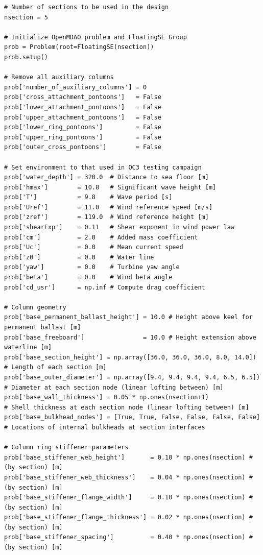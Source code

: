 \begin{lstlisting}
# Number of sections to be used in the design
nsection = 5

# Initialize OpenMDAO problem and FloatingSE Group
prob = Problem(root=FloatingSE(nsection))
prob.setup()

# Remove all auxiliary columns
prob['number_of_auxiliary_columns'] = 0
prob['cross_attachment_pontoons']   = False
prob['lower_attachment_pontoons']   = False
prob['upper_attachment_pontoons']   = False
prob['lower_ring_pontoons']         = False
prob['upper_ring_pontoons']         = False
prob['outer_cross_pontoons']        = False

# Set environment to that used in OC3 testing campaign
prob['water_depth'] = 320.0  # Distance to sea floor [m]
prob['hmax']        = 10.8   # Significant wave height [m]
prob['T']           = 9.8    # Wave period [s]
prob['Uref']        = 11.0   # Wind reference speed [m/s]
prob['zref']        = 119.0  # Wind reference height [m]
prob['shearExp']    = 0.11   # Shear exponent in wind power law
prob['cm']          = 2.0    # Added mass coefficient
prob['Uc']          = 0.0    # Mean current speed
prob['z0']          = 0.0    # Water line
prob['yaw']         = 0.0    # Turbine yaw angle
prob['beta']        = 0.0    # Wind beta angle
prob['cd_usr']      = np.inf # Compute drag coefficient

# Column geometry
prob['base_permanent_ballast_height'] = 10.0 # Height above keel for permanent ballast [m]
prob['base_freeboard']                = 10.0 # Height extension above waterline [m]
prob['base_section_height'] = np.array([36.0, 36.0, 36.0, 8.0, 14.0])  # Length of each section [m]
prob['base_outer_diameter'] = np.array([9.4, 9.4, 9.4, 9.4, 6.5, 6.5]) # Diameter at each section node (linear lofting between) [m]
prob['base_wall_thickness'] = 0.05 * np.ones(nsection+1)               # Shell thickness at each section node (linear lofting between) [m]
prob['base_bulkhead_nodes'] = [True, True, False, False, False, False] # Locations of internal bulkheads at section interfaces

# Column ring stiffener parameters
prob['base_stiffener_web_height']       = 0.10 * np.ones(nsection) # (by section) [m]
prob['base_stiffener_web_thickness']    = 0.04 * np.ones(nsection) # (by section) [m]
prob['base_stiffener_flange_width']     = 0.10 * np.ones(nsection) # (by section) [m]
prob['base_stiffener_flange_thickness'] = 0.02 * np.ones(nsection) # (by section) [m]
prob['base_stiffener_spacing']          = 0.40 * np.ones(nsection) # (by section) [m]


\end{lstlisting}
